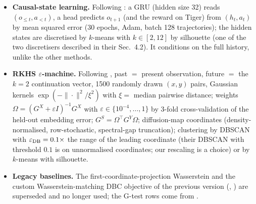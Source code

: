 \documentclass[10pt]{article}
\begin{document}
\begin{itemize}
  choice and affects those baselines.
\item \textbf{Causal-state learning.}  Following \citet{Zhang2019causal}: a GRU
  (hidden size 32) reads $(o_{\le t},a_{<t})$, a head predicts $o_{t+1}$ (and the
  reward on Tiger) from $(h_t,a_t)$ by mean squared error (30 epochs, Adam,
  batch 128 trajectories); the hidden states are discretised by $k$-means with
  $k\in[2,12]$ by silhouette (one of the two discretisers described in their
  Sec.~4.2).  It conditions on the full history, unlike the other methods.
\item \textbf{RKHS $\varepsilon$-machine.}  Following \citet{Brodu2022}, past
  $=$ present observation, future $=$ the $k=2$ continuation vector, 1500
  randomly drawn $(x,y)$ pairs, Gaussian kernels $\exp(-\|\cdot\|^2/\xi^2)$ with
  $\xi=$ median pairwise distance; weights $\Omega=(G^X+\varepsilon I)^{-1}G^X$ with
  $\varepsilon\in\{10^{-4},\dots,1\}$ by 3-fold cross-validation of the held-out
  embedding error; $G^S=\Omega^\top G^Y\Omega$; diffusion-map coordinates
  (density-normalised, row-stochastic, spectral-gap truncation); clustering by
  DBSCAN with $\varepsilon_{\rm DB}=0.1\times$ the range of the leading
  coordinate (their DBSCAN with threshold $0.1$ is on unnormalised coordinates;
  our rescaling is a choice) or by $k$-means with silhouette.
\item \textbf{Legacy baselines.}  The first-coordinate-projection Wasserstein and
  the custom Wasserstein-matching DBC objective of the previous version
  (, ) are superseded and
  no longer used; the G-test rows come from .
\end{itemize}
\end{document}
